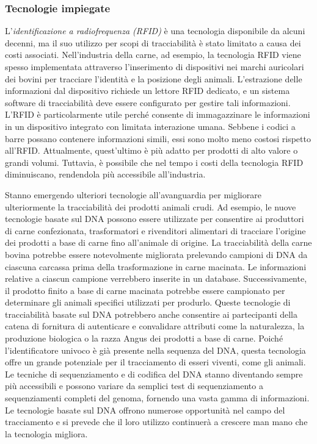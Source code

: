 \subsubsection{Tecnologie impiegate}

L'\textit{identificazione a radiofrequenza (RFID)} è una tecnologia disponibile da alcuni decenni, ma il suo utilizzo per scopi di tracciabilità è stato limitato a causa dei costi associati. Nell'industria della carne, ad esempio, la tecnologia RFID viene spesso implementata attraverso l'inserimento di dispositivi nei marchi auricolari dei bovini per tracciare l'identità e la posizione degli animali. L'estrazione delle informazioni dal dispositivo richiede un lettore RFID dedicato, e un sistema software di tracciabilità deve essere configurato per gestire tali informazioni. L'RFID è particolarmente utile perché consente di immagazzinare le informazioni in un dispositivo integrato con limitata interazione umana. Sebbene i codici a barre possano contenere informazioni simili, essi sono molto meno costosi rispetto all'RFID. Attualmente, quest'ultimo è più adatto per prodotti di alto valore o grandi volumi. Tuttavia, è possibile che nel tempo i costi della tecnologia RFID diminuiscano, rendendola più accessibile all'industria.

Stanno emergendo ulteriori tecnologie all'avanguardia per migliorare ulteriormente la tracciabilità dei prodotti animali crudi. Ad esempio, le nuove tecnologie basate sul DNA possono essere utilizzate per consentire ai produttori di carne confezionata, trasformatori e rivenditori alimentari di tracciare l'origine dei prodotti a base di carne fino all'animale di origine. La tracciabilità della carne bovina potrebbe essere notevolmente migliorata prelevando campioni di DNA da ciascuna carcassa prima della trasformazione in carne macinata. Le informazioni relative a ciascun campione verrebbero inserite in un database. Successivamente, il prodotto finito a base di carne macinata potrebbe essere campionato per determinare gli animali specifici utilizzati per produrlo. Queste tecnologie di tracciabilità basate sul DNA potrebbero anche consentire ai partecipanti della catena di fornitura di autenticare e convalidare attributi come la naturalezza, la produzione biologica o la razza Angus dei prodotti a base di carne. Poiché l'identificatore univoco è già presente nella sequenza del DNA, questa tecnologia offre un grande potenziale per il tracciamento di esseri viventi, come gli animali. Le tecniche di sequenziamento e di codifica del DNA stanno diventando sempre più accessibili e possono variare da semplici test di sequenziamento a sequenziamenti completi del genoma, fornendo una vasta gamma di informazioni. Le tecnologie basate sul DNA offrono numerose opportunità nel campo del tracciamento e si prevede che il loro utilizzo continuerà a crescere man mano che la tecnologia migliora.

